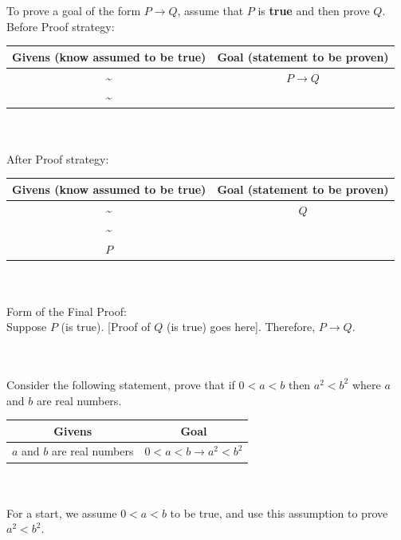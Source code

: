 \documentclass[../setup.tex]{subfiles}
\begin{document}
\begin{theorem}
	To prove a goal of the form $P \rightarrow Q$, assume that $P$ is \textbf{true} and then prove $Q$. \\
	Before Proof strategy:
	\begin{center}
	\begin{tabular}[t]{| c | c |}
		\hline
		Givens (know assumed to be true) & Goal (statement to be proven) \\
		\hline
		\textasciitilde & $P \rightarrow Q$ \\
		\textasciitilde & \\
		\hline
	\end{tabular}
	\end{center}
	\phantom \\ \\
	After Proof strategy:
	\begin{center}
	\begin{tabular}[t]{| c | c |}
		\hline
		Givens (know assumed to be true) & Goal (statement to be proven) \\
		\hline
		\textasciitilde & $Q$ \\
		\textasciitilde & \\
		$P$ & \\
		\hline
	\end{tabular}
	\end{center}
	\phantom \\ \\
	Form of the Final Proof: \\
	Suppose $P$ (is true). [Proof of $Q$ (is true) goes here]. Therefore, $P \rightarrow Q$.
\end{theorem}
\phantom \\ \\
Consider the following statement, prove that if $0 < a < b$ then $a^2 < b^2$ where $a$ and $b$ are real numbers. \\
\begin{center}
	\begin{tabular}[t]{| c | c |}
		\hline
		Givens  & Goal  \\
		\hline
		$a$ and $b$ are real numbers & $0 < a < b \rightarrow a^2 < b ^2$ \\
		\hline
	\end{tabular}
\end{center}
\phantom \\ \\
For a start, we assume $0 < a < b$ to be true, and use this assumption to prove $a^2 < b^2$.
\end{document}

